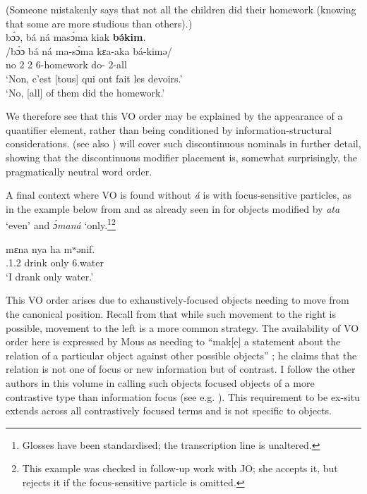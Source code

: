 \documentclass[output=paper,colorlinks,citecolor=brown
]{langscibook}
\begin{document}
 
\ea
(Someone mistakenly says that not all the children did their homework (knowing that some are more studious than others).) \\ 
\glll
{\db}bɔ́ɔ, bá ná masɔ́ma kiak \textbf{bə́kim}. \\
/bɔ́ɔ bá ná ma-sɔ́ma kɛa-aka bá-kimə/ \\
{\db}no 2\SM{} \PST{}2{} 6-homework do-\DUR{} 2-all \\
\glt
`Non, c'est [tous]\textsubscript{\FOC{}} qui ont fait les devoirs.' \\ `No, [all]\textsubscript{\FOC{}} of them did the homework.' \jambox*{[EE+EB 1824] }

 \z
 
We therefore see that this VO order may be explained by the appearance of a quantifier element, rather than being conditioned by information-structural considerations.  (see also \citealp[Chapter 7]{KerrFut}) will cover such discontinuous nominals in further detail, showing that the discontinuous modifier placement is, somewhat surprisingly, the pragmatically neutral word order.

A final context where VO is found without \textit{á} is with focus-sensitive particles, as in the example below from \citet{Mous1997} and as already seen in  for objects modified by \textit{ata} `even' and \textit{ɔ́maná} `only.\footnote{Glosses have been standardised; the transcription line is unaltered.}\footnote{This example was checked in follow-up work with JO; she accepts it, but rejects it if the focus-sensitive particle is omitted.}

\ea
\label{mous1997onlyVO}
\gll
mɛna nya ha mʷənif.\\
\SM{}.1\SG{}.\PST{}2{} drink only 6.water \\
\glt 
`I drank only water.' 

\z

This VO order arises due to exhaustively-focused objects needing to move from the canonical position. Recall from  that while such movement to the right is possible, movement to the left is a more common strategy. The availability of VO order here  is expressed by Mous as needing to ``mak[e] a statement about the relation of a particular object against other possible objects'' \citep[127]{Mous1997}; he claims that the relation is not one of focus or new information but of contrast. I follow the other authors in this volume in calling such objects focused objects of a more contrastive type than information focus (see e.g. \citealt{BianchiEtAl2015, Cruschina2021}). This requirement to be ex-situ extends across all contrastively focused terms and is not specific to objects.\largerpage
\end{document}
